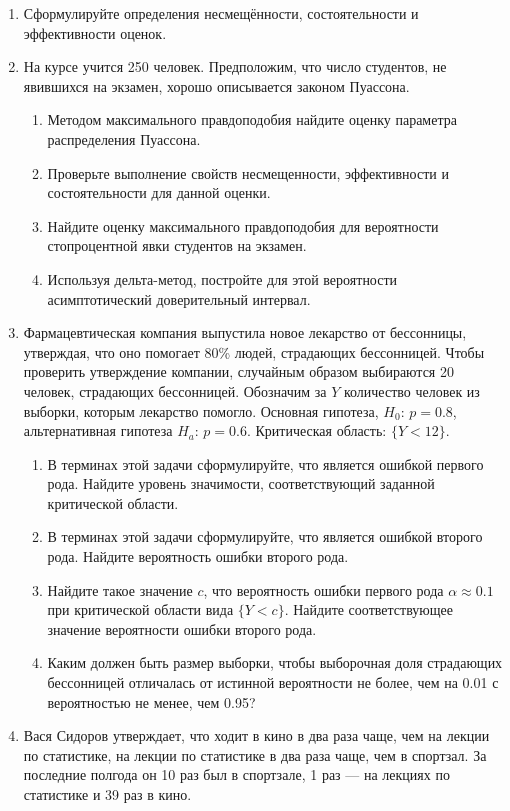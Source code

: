 \documentclass[12pt, a4paper]{article}\usepackage[]{graphicx}\usepackage[]{color}
\begin{document}
\begin{enumerate}
\item	Сформулируйте определения несмещённости, состоятельности и эффективности оценок.

\item На курсе учится 250 человек. Предположим, что число студентов, не явившихся на экзамен, хорошо описывается законом Пуассона.
\begin{enumerate}
\item	Методом максимального правдоподобия найдите оценку параметра распределения Пуассона.
\item	Проверьте выполнение свойств несмещенности, эффективности и состоятельности для данной оценки.
\item	Найдите оценку максимального правдоподобия для вероятности стопроцентной явки студентов на экзамен.
\item	Используя дельта-метод, постройте для этой вероятности асимптотический доверительный интервал.
\end{enumerate}

\item	Фармацевтическая компания выпустила новое лекарство от бессонницы, утверждая, что оно помогает 80\% людей, страдающих бессонницей. Чтобы проверить утверждение компании, случайным образом выбираются 20 человек, страдающих бессонницей. Обозначим за $Y$ количество человек из выборки, которым лекарство помогло. Основная гипотеза, $H_0$: $p=0.8$, альтернативная гипотеза $H_a$: $p=0.6$. Критическая область: $\{Y<12\}$.
\begin{enumerate}
\item	В терминах этой задачи сформулируйте, что является ошибкой первого рода.
Найдите уровень значимости, соответствующий заданной критической области.
\item	В терминах этой задачи сформулируйте, что является ошибкой второго рода.
Найдите вероятность ошибки второго рода.
\item	Найдите такое значение $c$, что вероятность ошибки первого рода $\alpha \approx 0.1$ при критической области вида $\{Y<c\}$. Найдите соответствующее значение вероятности ошибки второго рода.
\item	Каким должен быть размер выборки, чтобы выборочная доля страдающих бессонницей отличалась от истинной вероятности не более, чем на 0.01 с вероятностью не менее, чем 0.95?
\end{enumerate}

\item	Вася Сидоров утверждает, что ходит в кино в два раза чаще, чем на лекции по статистике, на лекции по статистике в два раза чаще, чем в спортзал. За последние полгода он 10 раз был в спортзале, 1 раз — на лекциях по статистике и 39 раз в кино.


\end{enumerate}
\end{document}
